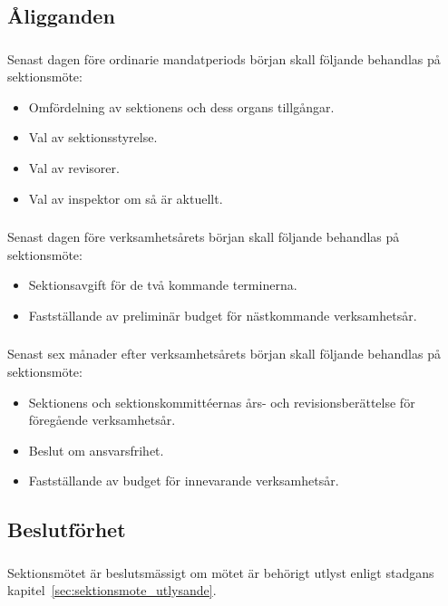 \documentclass[a4paper]{dtek}
\begin{document}
\subsection{Åligganden}
\subsubsection{}
Senast dagen före ordinarie mandatperiods början skall följande behandlas på sektionsmöte:
\begin{itemize}
\item Omfördelning av sektionens och dess organs tillgångar.
\item Val av sektionsstyrelse.
\item Val av revisorer.
\item Val av inspektor om så är aktuellt.
\end{itemize}
\subsubsection{}
Senast dagen före verksamhetsårets början skall följande behandlas på sektionsmöte:
\begin{itemize}
\item Sektionsavgift för de två kommande terminerna.
\item Fastställande av preliminär budget för nästkommande verksamhetsår.
\end{itemize}
\subsubsection{}
Senast sex månader efter verksamhetsårets början skall följande behandlas på sektionsmöte:
\begin{itemize}
\item Sektionens och sektionskommittéernas års- och revisionsberättelse för föregående verksamhetsår.
\item Beslut om ansvarsfrihet.
\item Fastställande av budget för innevarande verksamhetsår.
\end{itemize}
\subsection{Beslutförhet}
\subsubsection{}
Sektionsmötet är beslutsmässigt om mötet är behörigt utlyst enligt stadgans kapitel~\ref{sec:sektionsmote_utlysande}.
\end{document}
